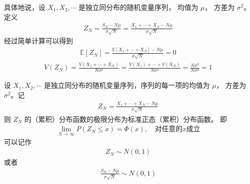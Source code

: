 \documentclass[letterpaper,10pt,english]{sphinxmanual}
\begin{document}
具体地说，设 \(X_1,X_2,\cdots\) 是独立同分布的随机变量序列，
均值为 \(\mu\)，
方差为 \(\sigma^2\)。
定义
\begin{equation}\label{equation:推断与检验/content:推断与检验/content:36}
\begin{split}Z_N = \frac{S_N - N \mu}{\sigma \sqrt{N}} = \frac{X_1+\cdots+X_N - N\mu}{\sigma \sqrt{N}}\end{split}
\end{equation}
经过简单计算可以得到
\begin{equation}\label{equation:推断与检验/content:推断与检验/content:37}
\begin{split}\mathbb{E}[Z_N] = \frac{\mathbb{E}[X_1+\cdots+X_N] -N\mu }{\sigma \sqrt{N}} = 0\end{split}
\end{equation}\begin{equation}\label{equation:推断与检验/content:推断与检验/content:38}
\begin{split}V(Z_N) = \frac{V(X_1+\cdots+X_N) }{N\sigma^2} = \frac{V(X_1)+\cdots+V(X_N)}{N\sigma^2}
= \frac{N\sigma^2}{N\sigma^2} = 1\end{split}
\end{equation}
\begin{sphinxShadowBox}

设 \(X_1,X_2,\cdots\) 是独立同分布的随机变量序列，序列的每一项的均值为 \(\mu\)，
方差为 \(\sigma^2\)。记
\begin{equation}\label{equation:推断与检验/content:推断与检验/content:39}
\begin{split}Z_N  = \frac{X_1+\cdots+X_N - N\mu}{\sigma \sqrt{N}}\end{split}
\end{equation}
则 \(Z_N\) 的（累积）分布函数的极限分布为标准正态（累积）分布函数。
即
\begin{equation}\label{equation:推断与检验/content:推断与检验/content:40}
\begin{split}\lim_{N \rightarrow \infty} P(Z_N \leq x) = \Phi(x), \quad \text{对任意的}x\text{成立}\end{split}
\end{equation}
可以记作
\begin{equation}\label{equation:推断与检验/content:推断与检验/content:41}
\begin{split}Z_N \sim N(0,1)\end{split}
\end{equation}
或者
\begin{equation}\label{equation:推断与检验/content:推断与检验/content:42}
\begin{split}\frac{S_N - N\mu}{\sigma \sqrt{N}} \sim N(0,1)\end{split}
\end{equation}\end{sphinxShadowBox}
\end{document}

